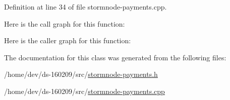 Definition at line 34 of file stormnode-\/payments.\+cpp.



Here is the call graph for this function\+:




Here is the caller graph for this function\+:




The documentation for this class was generated from the following files\+:\begin{DoxyCompactItemize}
\item 
/home/dev/ds-\/160209/src/\hyperlink{stormnode-payments_8h}{stormnode-\/payments.\+h}\item 
/home/dev/ds-\/160209/src/\hyperlink{stormnode-payments_8cpp}{stormnode-\/payments.\+cpp}\end{DoxyCompactItemize}
